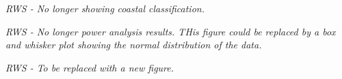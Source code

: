 \documentclass{ametsoc}
\begin{document}
\emph{RWS - No longer showing coastal classification.}

\emph{RWS - No longer power analysis results. THis figure could be replaced by a box and whisker plot showing the normal distribution of the data.}

\emph{RWS - To be replaced with a new figure.}
\end{document}

